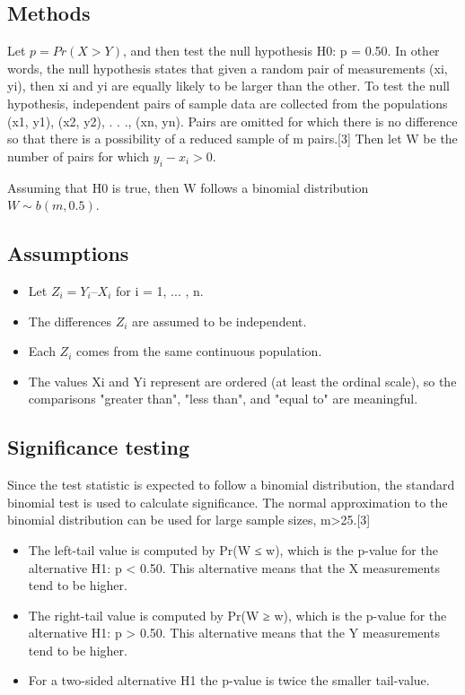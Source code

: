 \subsection*{Methods}
Let $p = Pr(X > Y)$, and then test the null hypothesis H0: p = 0.50. In other words, the null hypothesis states that given a random pair of measurements (xi, yi), then xi and yi are equally likely to be larger than the other.
To test the null hypothesis, independent pairs of sample data are collected from the populations {(x1, y1), (x2, y2), . . ., (xn, yn)}. Pairs are omitted for which there is no difference so that there is a possibility of a reduced sample of m pairs.[3]
Then let W be the number of pairs for which $y_i − x_i > 0$. 

Assuming that H0 is true, then W follows a binomial distribution $W \sim b(m, 0.5)$.
\subsection*{Assumptions}
\begin{itemize}
\item Let $Z_i = Y_i – X_i$ for i = 1, ... , n.
\item The differences $Z_i$ are assumed to be independent.
\item Each $Z_i$ comes from the same continuous population.
\item The values Xi and Yi represent are ordered (at least the ordinal scale), so the comparisons "greater than", "less than", and "equal to" are meaningful.
\end{itemize}

\subsection*{Significance testing}
Since the test statistic is expected to follow a binomial distribution, the standard binomial test is used to calculate significance. The normal approximation to the binomial distribution can be used for large sample sizes, m>25.[3]

\begin{itemize}
\item The left-tail value is computed by Pr(W ≤ w), which is the p-value for the alternative H1: p < 0.50. This alternative means that the X measurements tend to be higher.
\item The right-tail value is computed by Pr(W ≥ w), which is the p-value for the alternative H1: p > 0.50. This alternative means that the Y measurements tend to be higher.
\item For a two-sided alternative H1 the p-value is twice the smaller tail-value.
\end{itemize}


